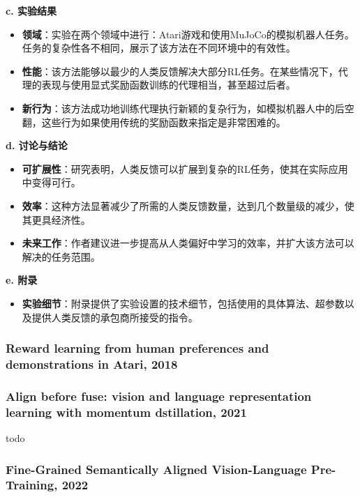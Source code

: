 \documentclass[twocolumn, 10pt]{article} %
\begin{document}
\noindent\textbf{c. 实验结果}
\begin{itemize}
    \item \textbf{领域}：实验在两个领域中进行：Atari游戏和使用MuJoCo的模拟机器人任务。任务的复杂性各不相同，展示了该方法在不同环境中的有效性。
    \item \textbf{性能}：该方法能够以最少的人类反馈解决大部分RL任务。在某些情况下，代理的表现与使用显式奖励函数训练的代理相当，甚至超过后者。
    \item \textbf{新行为}：该方法成功地训练代理执行新颖的复杂行为，如模拟机器人中的后空翻，这些行为如果使用传统的奖励函数来指定是非常困难的。
\end{itemize}

\noindent\textbf{d. 讨论与结论}
\begin{itemize}
    \item \textbf{可扩展性}：研究表明，人类反馈可以扩展到复杂的RL任务，使其在实际应用中变得可行。
    \item \textbf{效率}：这种方法显著减少了所需的人类反馈数量，达到几个数量级的减少，使其更具经济性。
    \item \textbf{未来工作}：作者建议进一步提高从人类偏好中学习的效率，并扩大该方法可以解决的任务范围。
\end{itemize}

\noindent\textbf{e. 附录}
\begin{itemize}
    \item \textbf{实验细节}：附录提供了实验设置的技术细节，包括使用的具体算法、超参数以及提供人类反馈的承包商所接受的指令。
\end{itemize}








\subsubsection{Reward learning from human preferences and demonstrations in Atari, 2018}


\subsubsection{Align before fuse: vision and language representation learning with momentum dstillation, 2021}
todo

\subsubsection{Fine-Grained Semantically Aligned Vision-Language Pre-Training, 2022}
\end{document}
